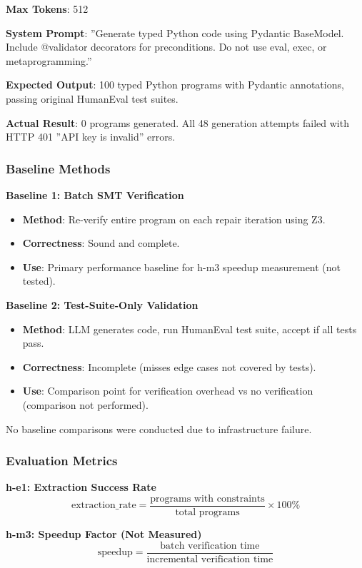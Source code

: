 \textbf{Max Tokens}: 512

\textbf{System Prompt}: ''Generate typed Python code using Pydantic BaseModel. Include @validator decorators for preconditions. Do not use eval, exec, or metaprogramming.''

\textbf{Expected Output}: 100 typed Python programs with Pydantic annotations, passing original HumanEval test suites.

\textbf{Actual Result}: 0 programs generated. All 48 generation attempts failed with HTTP 401 ''API key is invalid'' errors.

\subsubsection{Baseline Methods}

\textbf{Baseline 1: Batch SMT Verification}
\begin{itemize}
\item \textbf{Method}: Re-verify entire program on each repair iteration using Z3.
\item \textbf{Correctness}: Sound and complete.
\item \textbf{Use}: Primary performance baseline for h-m3 speedup measurement (not tested).
\end{itemize}

\textbf{Baseline 2: Test-Suite-Only Validation}
\begin{itemize}
\item \textbf{Method}: LLM generates code, run HumanEval test suite, accept if all tests pass.
\item \textbf{Correctness}: Incomplete (misses edge cases not covered by tests).
\item \textbf{Use}: Comparison point for verification overhead vs no verification (comparison not performed).
\end{itemize}

No baseline comparisons were conducted due to infrastructure failure.

\subsubsection{Evaluation Metrics}

\textbf{h-e1: Extraction Success Rate}
$$\text{extraction\_rate} = \frac{\text{programs with constraints}}{\text{total programs}} \times 100\%$$

\textbf{h-m3: Speedup Factor (Not Measured)}
$$\text{speedup} = \frac{\text{batch verification time}}{\text{incremental verification time}}$$

